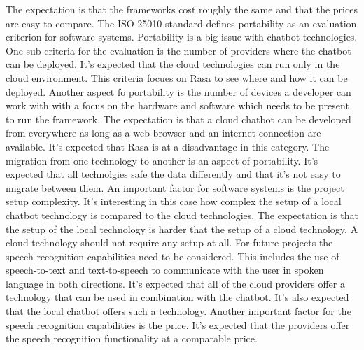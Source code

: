 The expectation is that the frameworks cost roughly the same and that 
the prices are easy to compare.
The ISO 25010\cite{iso25010} standard defines portability as an evaluation criterion for software systems.
Portability is a big issue with chatbot technologies.
One sub criteria for the evaluation is the number of providers where the chatbot 
can be deployed.
It's expected that the cloud technologies can run only in the cloud environment.
This criteria focues on Rasa to see where and how it can be deployed.
Another aspect fo portability is the number of devices a developer can work with 
with a focus on the hardware and software which needs to be present to run the 
framework.
The expectation is that a cloud chatbot can be developed from everywhere 
as long as a web-browser and an internet connection are available.
It's expected that Rasa is at a disadvantage in this category.
The migration from one technology to another is an aspect of portability.
It's expected that all technolgies safe the data differently and that it's not 
easy to migrate between them.
An important factor for software systems is the project setup complexity.
It's interesting in this case how complex the setup of a local chatbot 
technology is compared to the cloud technologies.
The expectation is that the setup of the local technology is harder 
that the setup of a cloud technology.
A cloud technology should not require any setup at all.
For future projects the speech recognition capabilities need to be considered.
This includes the use of speech-to-text and text-to-speech to communicate with the user 
in spoken language in both directions.
It's expected that all of the cloud providers offer a 
technology that can be used in combination with the chatbot.
It's also expected that the local chatbot offers such a technology.
Another important factor for the speech recognition capabilities is the 
price.
It's expected that the providers offer the speech recognition functionality 
at a comparable price.



